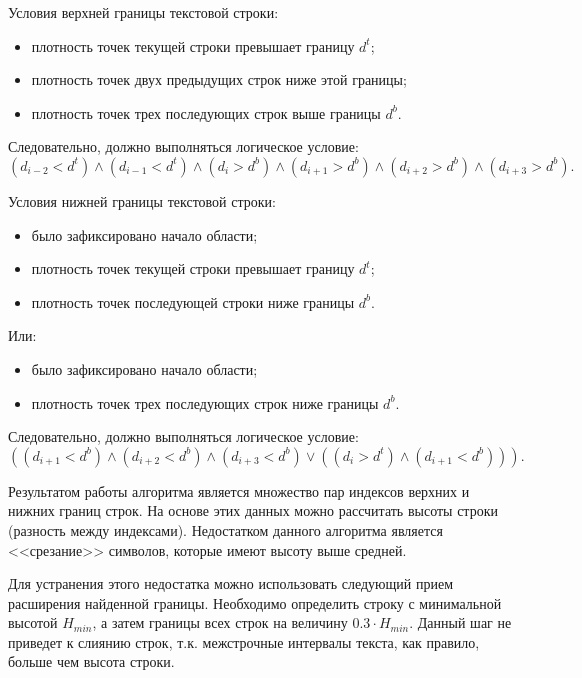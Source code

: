 Условия верхней границы текстовой строки:
\begin{itemize}
  \item плотность точек текущей строки превышает границу $ d^{t} $;
  \item плотность точек двух предыдущих строк ниже этой границы;
  \item плотность точек трех последующих строк выше границы $ d^{b} $.
\end{itemize}

Следовательно, должно выполняться логическое условие:
\begin{equation}
  \label{eq:architecture:logic_up_interval}
  (d_{i-2} < d^{t}) \wedge (d_{i-1} < d^{t}) \wedge (d_i > d^{b}) \wedge (d_{i+1} > d^{b}) \wedge (d_{i+2} > d^{b}) \wedge (d_{i+3} > d^{b}).
\end{equation}

Условия нижней границы текстовой строки:
\begin{itemize}     
  \item было зафиксировано начало области;
  \item плотность точек текущей строки превышает границу $ d^{t} $;
  \item плотность точек последующей строки ниже границы $ d^{b} $.
\end{itemize}
     
Или:

\begin{itemize}
   \item было зафиксировано начало области;
   \item плотность точек трех последующих строк ниже границы $ d^{b} $.
\end{itemize}

Следовательно, должно выполняться логическое условие:
\begin{equation}
  \label{eq:architecture:logic_down_interval}
  ((d_{i+1} < d^{b}) \wedge (d_{i+2} < d^{b}) \wedge (d_{i+3} < d^{b}) \vee ((d_i > d^{t}) \wedge (d_{i+1} < d^{b}))).
\end{equation}

Результатом работы алгоритма является множество пар индексов верхних и нижних границ строк. На основе этих данных можно рассчитать высоты строки (разность между индексами). Недостатком данного алгоритма является <<срезание>> символов, которые имеют высоту выше средней.

Для устранения этого недостатка можно использовать следующий прием расширения найденной границы. Необходимо определить строку с минимальной высотой $ H_{min} $, а затем границы всех строк на величину $ 0.3 \cdot  H_{min} $. Данный шаг не приведет к слиянию строк, т.к. межстрочные интервалы текста, как правило, больше чем высота строки.
 
